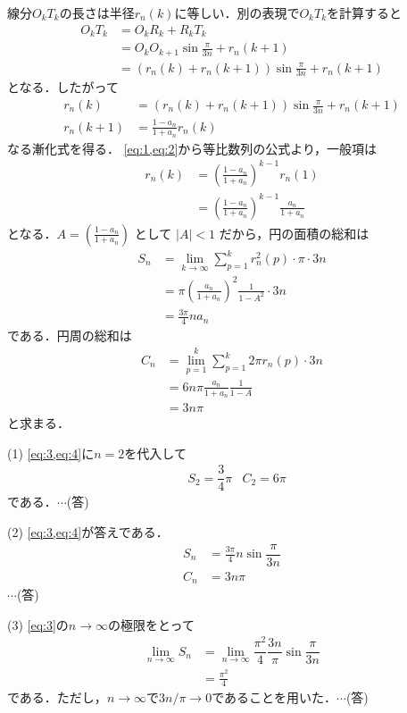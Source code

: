 \documentclass[a4paper,10pt]{ltjsarticle}
\begin{document}
\begin{multicols}{2}
線分$O_kT_k$の長さは半径$r_n(k)$に等しい．別の表現で$O_kT_k$を計算すると
\begin{align*}
  O_kT_k 
  &= O_kR_k + R_kT_k \\
  &= O_kO_{k+1}\sin\frac{\pi}{3n} + r_n(k+1) \\
  &= \left(r_n(k)+r_n(k+1)\right)\sin\frac{\pi}{3n} + r_n(k+1) 
\end{align*}
となる．したがって
\begin{align*}
  r_n(k) &= \left(r_n(k)+r_n(k+1)\right)\sin\frac{\pi}{3n} + r_n(k+1)  \\
  r_n(k+1) &= \frac{1-a_n}{1+a_n}r_n(k) \label{eq:2}
\end{align*}
なる漸化式を得る．
\cref{eq:1,eq:2}から等比数列の公式より，一般項は
\begin{align}
r_n(k) 
 &= \left(\frac{1-a_n}{1+a_n}\right)^{k-1} r_n(1) \\
 &= \left(\frac{1-a_n}{1+a_n}\right)^{k-1}\frac{a_n}{1+a_n}
\end{align}
となる．$A = \left(\frac{1-a_n}{1+a_n}\right)$ として $|A|<1$ だから，円の面積の総和は
\begin{align}
S_n 
&= \lim_{k \to \infty} \sum_{p=1}^{k} r^2_n(p) \cdot \pi \cdot 3n \\
&= \pi \left(\frac{a_n}{1+a_n}\right)^2 \frac{1}{1-A^2} \cdot 3n \\
&= \frac{3\pi}{4} n a_n  \label{eq:3}
\end{align}
である．円周の総和は
\begin{align}
C_n 
&= \lim_{p=1}^{k} \sum_{p=1}^{k} 2\pi r_n(p) \cdot 3n \\
&= 6n\pi \frac{a_n}{1+a_n} \frac{1}{1-A} \\
&= 3n\pi \label{eq:4}
\end{align}
と求まる．

\vspace{10pt}
(1)
\cref{eq:3,eq:4}に$n=2$を代入して
\begin{align*}
  &S_2 = \dfrac{3}{4}\pi & C_2 = 6\pi
\end{align*}
である．$\cdots$(答)

\vspace{10pt}
(2)
\cref{eq:3,eq:4}が答えである．
\begin{align*}
  S_n &= \frac{3\pi}{4} n \sin \dfrac{\pi}{3n} \\
  C_n &= 3n\pi
\end{align*}$\cdots$(答)

\vspace{10pt}
(3)
\cref{eq:3}の$n\to\infty$の極限をとって
\begin{align*}
  \lim_{n\to\infty} S_n 
  &= \lim_{n\to\infty} \dfrac{\pi^2}{4} \dfrac{3n}{\pi} \sin \dfrac{\pi}{3n} \\
  &= \frac{\pi^2}{4} 
\end{align*}
である．ただし，$n\to\infty$で$3n/\pi\to 0$であることを用いた．$\cdots$(答)


\end{multicols}
\end{document}
